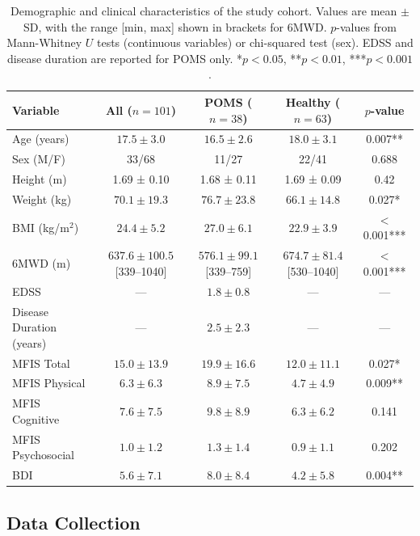 \documentclass{article}
\begin{document}
\begin{table}[!ht]
\centering
\caption{Demographic and clinical characteristics of the study cohort. Values are mean $\pm$ SD, with the range [min, max] shown in brackets for 6MWD. $p$-values from Mann-Whitney $U$ tests (continuous variables) or chi-squared test (sex). EDSS and disease duration are reported for POMS only. *$p<0.05$, **$p<0.01$, ***$p<0.001$.}
\label{tab:demographics}
\small
\begin{tabular}{@{}lcccc@{}}
\toprule
Variable & All ($n=101$) & POMS ($n=38$) & Healthy ($n=63$) & $p$-value \\
\midrule
Age (years) & $17.5 \pm 3.0$ & $16.5 \pm 2.6$ & $18.0 \pm 3.1$ & 0.007** \\
Sex (M/F) & 33/68 & 11/27 & 22/41 & 0.688 \\
Height (m) & 1.69 ± 0.10 & 1.68 ± 0.11 & 1.69 ± 0.09 & 0.42 \\
Weight (kg) & $70.1 \pm 19.3$ & $76.7 \pm 23.8$ & $66.1 \pm 14.8$ & 0.027* \\
BMI (kg/m$^2$) & $24.4 \pm 5.2$ & $27.0 \pm 6.1$ & $22.9 \pm 3.9$ & $<$0.001*** \\
6MWD (m) & $637.6 \pm 100.5$ [339--1040] & $576.1 \pm 99.1$ [339--759] & $674.7 \pm 81.4$ [530--1040] & $<$0.001*** \\
\addlinespace
EDSS & --- & $1.8 \pm 0.8$ & --- & --- \\
Disease Duration (years) & --- & $2.5 \pm 2.3$ & --- & --- \\
\addlinespace
MFIS Total & $15.0 \pm 13.9$ & $19.9 \pm 16.6$ & $12.0 \pm 11.1$ & 0.027* \\
MFIS Physical & $6.3 \pm 6.3$ & $8.9 \pm 7.5$ & $4.7 \pm 4.9$ & 0.009** \\
MFIS Cognitive & $7.6 \pm 7.5$ & $9.8 \pm 8.9$ & $6.3 \pm 6.2$ & 0.141 \\
MFIS Psychosocial & $1.0 \pm 1.2$ & $1.3 \pm 1.4$ & $0.9 \pm 1.1$ & 0.202 \\
BDI & $5.6 \pm 7.1$ & $8.0 \pm 8.4$ & $4.2 \pm 5.8$ & 0.004** \\
\bottomrule
\end{tabular}
\end{table}

\subsection{Data Collection}\label{sec:collection}
\end{document}
